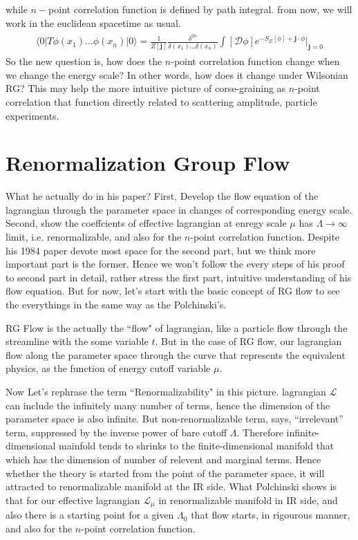 \documentclass[12pt,halfline,a4paper]{ouparticle}
\begin{document}
while $n-$point correlation function is defined by path integral. from now, we will work in the euclidean spacetime as usual.
\begin{align}\begin{split}
\label{correlation}
\langle 0|T\phi(x_1)...\phi(x_n)|0\rangle = \frac{1}{Z[\mathbf{j}]}\frac{\delta^{2n}}{\delta(x_1)...\delta(x_n)}\int [\mathcal{D}\phi] e^{-S_E[\phi]+\mathbf{j}\cdot\phi}\bigg\rvert_{\mathbf{j}=0}
\end{split}\end{align}
So the new question is, how does the $n$-point correlation function change when we change the energy scale? In other words, how does it change under Wilsonian RG?
This may help the more intuitive picture of corse-graining as $n$-point correlation that function directly related to scattering amplitude, particle experiments.

\section{Renormalization Group Flow}
\label{sec2}

What he actually do in his paper?
First, Develop the flow equation of the lagrangian through the parameter space in changes of corresponding energy scale.
Second, show the coeffcients of effective lagrangian at enregy scale $\mu$ has $\Lambda\rightarrow \infty$ limit, i.e. renormalizable, and also for the $n$-point correlation function.
Despite his 1984 paper devote most space for the second part, but we think more important part is the former. 
Hence we won't follow the every steps of his proof to second part in detail, rather stress the first part, intuitive understanding of his flow equation.
But for now, let's start with the basic concept of RG flow to see the everythings in the same way as the Polchinski's.

RG Flow is the actually the ``flow" of lagrangian, like a particle flow through the streamline with the some variable $t$.
But in the case of RG flow, our lagrangian flow along the parameter space through the curve that represents the equivalent physics,
as the function of energy cutoff variable $\mu$.

Now Let's rephrase the term ``Renormalizability" in this picture. lagrangian $\mathcal L$ can include the infinitely many number of terms, hence the dimension of the parameter space is also infinite.
But non-renormalizable term, says, ``irrelevant'' term, suppressed by the inverse power of bare cutoff $\Lambda$.
Therefore infinite-dimensional mainfold tends to shrinks to the finite-dimensional manifold that which has the dimension of number of relevent and marginal terms.
Hence whether the theory is started from the point of the parameter space, it will attracted to renormalizable manifold at the IR side. What Polchinski shows is that for our effective lagrangian $\mathcal{L}_\mu$ in renormalizable manifold in IR side,
and also there is a starting point for a given $\Lambda_0$ that flow starts, in rigourous manner, and also for the $n$-point correlation function.
\end{document}
